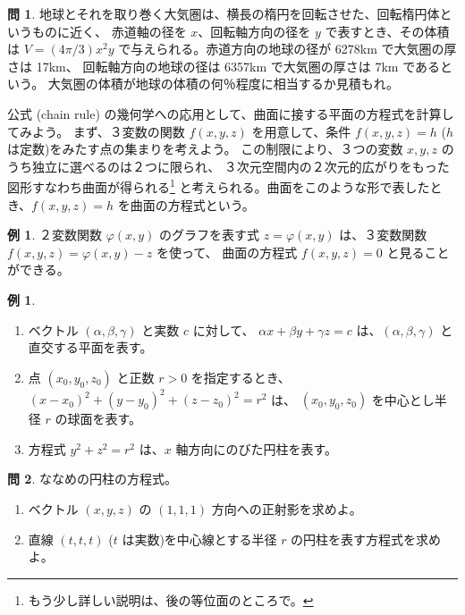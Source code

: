 \documentclass[a4paper]{jsarticle}
\theoremstyle{definition}
\newtheorem{Example}[Theorem]{例}
\newtheorem{Exercise}{問}%
\theoremstyle{remark}
\begin{document}
\begin{Exercise}
地球とそれを取り巻く大気圏は、横長の楕円を回転させた、回転楕円体というものに近く、
赤道軸の径を $x$、回転軸方向の径を $y$ で表すとき、その体積は 
$V = (4\pi/3) x^2y$ で与えられる。赤道方向の地球の径が 6278km で大気圏の厚さは 17km、
回転軸方向の地球の径は 6357km で大気圏の厚さは 7km であるという。
大気圏の体積が地球の体積の何％程度に相当するか見積もれ。
\end{Exercise}

\bigskip
{}

公式 (chain rule) の幾何学への応用として、曲面に接する平面の方程式を計算してみよう。
まず、３変数の関数 $f(x,y,z)$ を用意して、条件 $f(x,y,z) = h$ ($h$ は定数)をみたす点の集まりを考えよう。
この制限により、３つの変数 $x,y,z$ のうち独立に選べるのは２つに限られ、
３次元空間内の２次元的広がりをもった図形すなわち曲面が得られる\footnote{もう少し詳しい説明は、後の等位面のところで。} 
と考えられる。曲面をこのような形で表したとき、$f(x,y,z) = h$ を曲面の方程式という。

\begin{Example}
２変数関数 $\varphi(x,y)$ のグラフを表す式 $z = \varphi(x,y)$ は、３変数関数 $f(x,y,z) = \varphi(x,y) - z$ を使って、
曲面の方程式 $f(x,y,z) = 0$ と見ることができる。
\end{Example}

\begin{Example}~ 
  \begin{enumerate}
\item 
ベクトル $(\alpha, \beta,\gamma)$ と実数 $c$ に対して、
$\alpha x + \beta y + \gamma z = c$ は、$(\alpha, \beta,\gamma)$ と直交する平面を表す。
  \item 
点 $(x_0,y_0,z_0)$ と正数 $r>0$ を指定するとき、$(x-x_0)^2 + (y-y_0)^2 + (z-z_0)^2 = r^2$ は、
$(x_0,y_0,z_0)$ を中心とし半径 $r$ の球面を表す。
\item 
方程式 $y^2 + z^2 = r^2$ は、$x$ 軸方向にのびた円柱を表す。
  \end{enumerate}
\end{Example}

\begin{Exercise} ななめの円柱の方程式。
  \begin{enumerate}
  \item 
ベクトル $(x,y,z)$ の $(1,1,1)$ 方向への正射影を求めよ。
\item 
直線 $(t,t,t)$ ($t$ は実数)を中心線とする半径 $r$ の円柱を表す方程式を求めよ。
  \end{enumerate}
\end{Exercise} 
\end{document}
